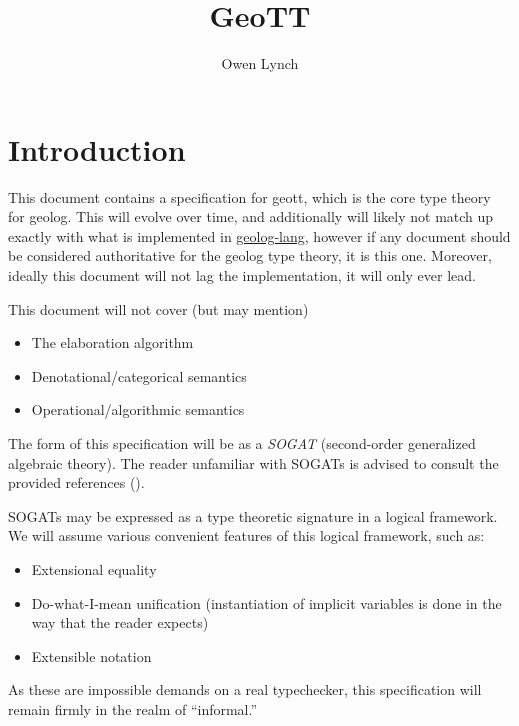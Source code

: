 \documentclass[fleqn,leqno]{article}
\title{GeoTT}
\author{Owen Lynch}
\begin{document}
\maketitle

\section{Introduction}

This document contains a specification for geott, which is the core type theory for geolog. This will evolve over time, and additionally will likely not match up exactly with what is implemented in \href{https://git.sgai.uk/creators/geolog/-/tree/main/geolog-lang}{geolog-lang}, however if any document should be considered authoritative for the geolog type theory, it is this one. Moreover, ideally this document will not lag the implementation, it will only ever lead.

This document will not cover (but may mention)

\begin{itemize}
  \item The elaboration algorithm
  \item Denotational/categorical semantics
  \item Operational/algorithmic semantics
\end{itemize}

The form of this specification will be as a \emph{SOGAT} (second-order generalized algebraic theory). The reader unfamiliar with SOGATs is advised to consult the provided references (\cite{uemura-2021-abstract,bocquet-2023-metatheory,kaposi-2024-secondorder,bocquet-2025-relative}).

SOGATs may be expressed as a type theoretic signature in a logical framework. We will assume various convenient features of this logical framework, such as:

\begin{itemize}
  \item Extensional equality
  \item Do-what-I-mean unification (instantiation of implicit variables is done in the way that the reader expects)
  \item Extensible notation
\end{itemize}

As these are impossible demands on a real typechecker, this specification will remain firmly in the realm of ``informal.''
\end{document}
